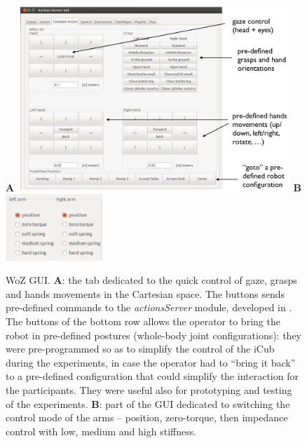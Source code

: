 \documentclass[twocolumn]{svjour3}          %
\begin{document}
\begin{figure}
\centering
{\large \textbf{\textsf{A}}} \includegraphics[height=7cm]{figures/gui_actions.jpg} \hspace{0.5cm}
{\large \textbf{\textsf{B}}} \includegraphics[height=2.5cm]{figures/gui_demoforcecontrol.jpg}
\caption{WoZ GUI. \textbf{\textsf{A}}: the tab dedicated to the quick control of gaze, grasps and hands movements in the Cartesian space. The buttons sends pre-defined commands to the \textit{actionsServer} module, developed in \cite{Ivaldi2014tamd}. The buttons of the bottom row allows the operator to bring the robot in pre-defined postures (whole-body joint configurations): they were pre-programmed so as to simplify the control of the iCub during the experiments, in case the operator had to ``bring it back'' to a pre-defined configuration that could simplify the interaction for the participants. They were useful also for prototyping and testing of the experiments. \textbf{\textsf{B}}: part of the GUI dedicated to switching the control mode of the arms -- position, zero-torque, then impedance control with low, medium and high stiffness.}
\label{fig:guiactions}
\end{figure}
\end{document}
